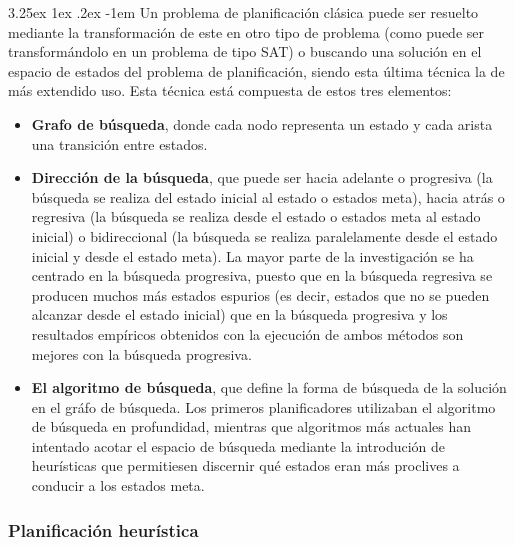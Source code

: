\documentclass{article}
\makeatletter
\renewcommand\paragraph{\@startsection{paragraph}{5}{\z@}%
  {3.25ex \@plus1ex \@minus.2ex}%
  {-1em}%
  {\normalfont\normalsize\bfseries}}
\makeatother
\begin{document}
\paragraph{}
Un problema de planificación clásica puede ser resuelto mediante la transformación de este en otro tipo de problema (como puede ser transformándolo en un problema de tipo SAT\cite{sat}) o buscando una solución en el espacio de estados del problema de planificación, siendo esta última técnica la de más extendido uso. Esta técnica está compuesta de estos tres elementos:
\begin{itemize}
    \item \textbf{Grafo de búsqueda}, donde cada nodo representa un estado y cada arista una transición entre estados.
    \item \textbf{Dirección de la búsqueda}, que puede ser hacia adelante o progresiva (la búsqueda se realiza del estado inicial al estado o estados meta), hacia atrás o regresiva (la búsqueda se realiza desde el estado o estados meta al estado inicial) o bidireccional (la búsqueda se realiza paralelamente desde el estado inicial y desde el estado meta). La mayor parte de la investigación se ha centrado en la búsqueda progresiva, puesto que en la búsqueda regresiva se producen muchos más estados espurios (es decir, estados que no se pueden alcanzar desde el estado inicial) que en la búsqueda progresiva y los resultados empíricos obtenidos con la ejecución de ambos métodos son mejores con la búsqueda progresiva.
    \item \textbf{El algoritmo de búsqueda}, que define la forma de búsqueda de la solución en el gráfo de búsqueda. Los primeros planificadores utilizaban el algoritmo de búsqueda en profundidad, mientras que algoritmos más actuales han intentado acotar el espacio de búsqueda mediante la introdución de heurísticas que permitiesen discernir qué estados eran más proclives a conducir a los estados meta.
    
\end{itemize}


        \subsubsection{Planificación heurística}
\end{document}
